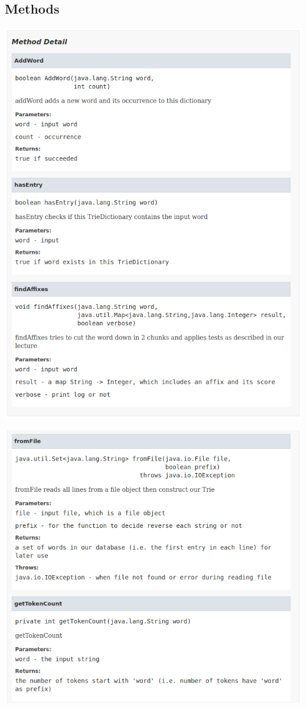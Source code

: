 \documentclass[12pt]{article}
\begin{document}
\subsection{Methods}
\begin{center}
	\includegraphics[width=\textwidth]{trie_dictionary_methods}
\end{center}

\begin{center}
	\includegraphics[width=\textwidth]{trie_dictionary_methods_b}
\end{center}
\end{document}
